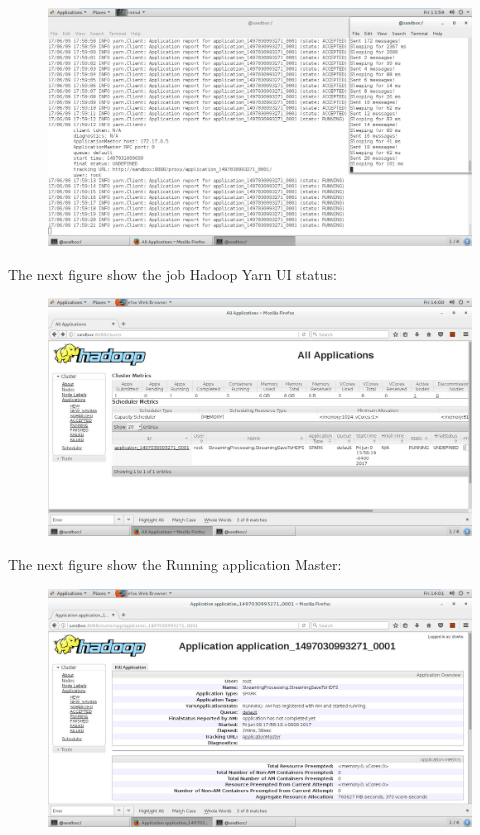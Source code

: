 \begin{figure}[h!]
	\centering
	\includegraphics[height=0.4\textheight]{fig01/BatchSaveTOHDFS}
	\label{fig:FilialesEtClients}
\end{figure}
\newpage
The next figure show the job Hadoop Yarn UI status:
\begin{figure}[h!]
	\centering
	\includegraphics[height=0.3\textheight]{fig01/RunningJobStatus}
	\label{fig:FilialesEtClients}
\end{figure}
\newline
The next figure show the Running application Master:
\begin{figure}[h!]
	\centering
	\includegraphics[height=0.3\textheight]{fig01/ApplicationMaster}
	\label{fig:FilialesEtClients}
\end{figure}

